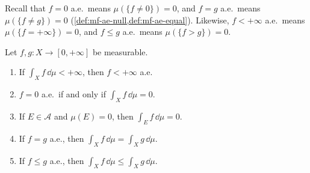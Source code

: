 Recall that $f=0$ a.e.\ means $\mu(\{f\ne0\})=0$, and $f=g$ a.e.\ means $\mu(\{f\ne g\})=0$
(\cref{def:mf-ae-null,def:mf-ae-equal}). Likewise, $f<+\infty$ a.e.\ means
$\mu(\{f=+\infty\})=0$, and $f\le g$ a.e.\ means $\mu(\{f>g\})=0$.

\begin{proposition}\label{prop:in-ae}
Let $f,g:X\to[0,+\infty]$ be measurable.
\begin{enumerate}[label=(\arabic*)]
  \item If $\int_Xf\,\dd\mu<+\infty$, then $f<+\infty$ a.e.
  \item $f=0$ a.e.\ if and only if $\int_Xf\,\dd\mu=0$.
  \item If $E\in\mathcal A$ and $\mu(E)=0$, then $\int_Ef\,\dd\mu=0$.
  \item If $f=g$ a.e., then $\int_Xf\,\dd\mu=\int_Xg\,\dd\mu$.
  \item If $f\le g$ a.e., then $\int_Xf\,\dd\mu\le\int_Xg\,\dd\mu$.
\end{enumerate}
\end{proposition}

